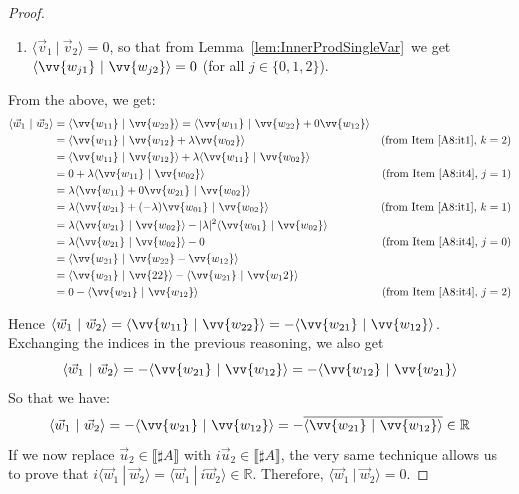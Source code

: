 \documentclass[a4paper,UKenglish,numberwithinsect,pdfa,anonymous]{lipics-v2021}
\theoremstyle{restatestyle}
\def\R{\mathbb{R}}            %
\def\scal#1#2{\langle{#1}~|~{#2}\rangle}
\def\sem#1{\llbracket#1\rrbracket}
\begin{document}
\begin{proof}
\begin{enumerate}
        \item\label{A8:it4} $\scal{\vec{v}_{1}}{\vec{v}_{2}}=0$, so that from Lemma~\ref{lem:InnerProdSingleVar}~we get $\scal{\vv{w_{j1}}}{\vv{w_{j2}}}=0$ (for all $j\in\{0,1,2\}$).
    \end{enumerate}

    From the above, we get:
    \begin{align*}
        \scal{\vec{w}_{1}}{\vec{w}_{2}} &= \scal{\vv{w_{11}}}{\vv{w_{22}}} = \scal{\vv{w_{11}}}{\vv{w_{22}}+0\vv{w_{12}}} & \\
        &=\scal{\vv{w_{11}}}{\vv{w_{12}}+ \lambda\vv{w_{02}}} & (\text{from Item~\ref{A8:it1}, } k=2)\\
        &=\scal{\vv{w_{11}}}{\vv{w_{12}}} + \lambda \scal{\vv{w_{11}}}{\vv{w_{02}}} &\\
        &= 0 + \lambda \scal{\vv{w_{11}}}{\vv{w_{02}}} & (\text{from Item~\ref{A8:it4}, } j=1)\\
        &= \lambda \scal{\vv{w_{11}} + 0\vv{w_{21}}}{\vv{w_{02}}} & \\
        &= \lambda \scal{\vv{w_{21}} + (-\lambda)\vv{w_{01}}}{\vv{w_{02}}} & (\text{from Item~\ref{A8:it1}, } k=1)\\
        &= \lambda \scal{\vv{w_{21}}}{\vv{w_{02}}} - |\lambda|^2 \scal{\vv{w_{01}}}{\vv{w_{02}}} & \\
        &= \lambda \scal{\vv{w_{21}}}{\vv{w_{02}}} - 0 & (\text{from Item~\ref{A8:it4}, } j=0)\\
        &=\scal{\vv{w_{21}}}{\vv{w_{22}}- \vv{w_{12}}} & \\
        &=\scal{\vv{w_{21}}}{\vv{22}} - \scal{\vv{w_{21}}}{\vv{w_12}} & \\
        &= 0 - \scal{\vv{w_{21}}}{\vv{w_{12}}} & (\text{from Item~\ref{A8:it4}, } j=2)
    \end{align*}

    Hence $\scal{\vec{w}_{1}}{\vec{w}_{2}} = \scal{\vv{w_{11}}}{\vv{w_{22}}} = - \scal{\vv{w_{21}}}{\vv{w_{12}}}$. Exchanging the indices in the previous reasoning, we also get 
    \[
    \scal{\vec{w}_{1}}{\vec{w}_{2}}=-\scal{\vv{w_{21}}}{\vv{w_{12}}}=-\scal{\vv{w_{12}}}{\vv{w_{21}}}
    \]
    So that we have:
    \[
        \scal{\vec{w}_{1}}{\vec{w}_{2}}=-\scal{\vv{w_{21}}}{\vv{w_{12}}}=-\overline{\scal{\vv{w_{21}}}{\vv{w_{12}}}}\in\R
    \]
    If we now replace $\vec{u}_{2}\in\sem{\sharp A}$ with $i\vec{u}_{2}\in\sem{\sharp A}$, the very same technique allows us to prove that $i\scal{\vec{w}_{1}}{\vec{w}_{2}}=\scal{\vec{w}_{1}}{i \vec{w}_{2}}\in\R$. Therefore, $\scal{\vec{w}_{1}}{\vec{w}_{2}}=0$.
\end{proof}
\end{document}
